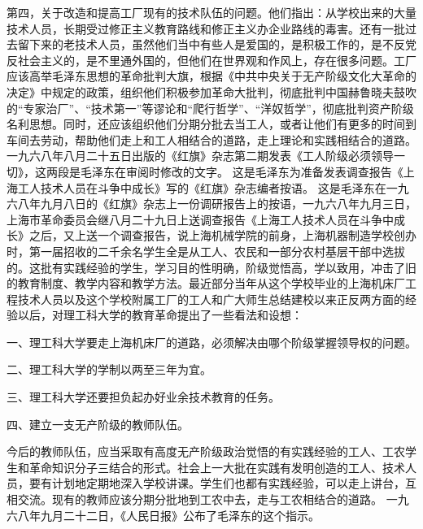 \begin{maonote}
第四，关于改造和提高工厂现有的技术队伍的问题。他们指出：从学校出来的大量技术人员，长期受过修正主义教育路线和修正主义办企业路线的毒害。还有一批过去留下来的老技术人员，虽然他们当中有些人是爱国的，是积极工作的，是不反党反社会主义的，是不里通外国的，但他们在世界观和作风上，存在很多问题。工厂应该高举毛泽东思想的革命批判大旗，根据《中共中央关于无产阶级文化大革命的决定》中规定的政策，组织他们积极参加革命大批判，彻底批判中国赫鲁晓夫鼓吹的“专家治厂”、“技术第一”等谬论和“爬行哲学”、“洋奴哲学”，彻底批判资产阶级名利思想。同时，还应该组织他们分期分批去当工人，或者让他们有更多的时间到车间去劳动，帮助他们走上和工人相结合的道路，走上理论和实践相结合的道路。
一九六八年八月二十五日出版的《红旗》杂志第二期发表《工人阶级必须领导一切》，这两段是毛泽东在审阅时修改的文字。
这是毛泽东为准备发表调查报告《上海工人技术人员在斗争中成长》写的《红旗》杂志编者按语。
这是毛泽东在一九六八年九月八日的《红旗》杂志上一份调研报告上的按语，一九六八年九月三日，上海市革命委员会继八月二十九日上送调查报告《上海工人技术人员在斗争中成长》之后，又上送一个调查报告，说上海机械学院的前身，上海机器制造学校创办时，第一届招收的二千余名学生全是从工人、农民和一部分农村基层干部中选拔的。这批有实践经验的学生，学习目的性明确，阶级觉悟高，学以致用，冲击了旧的教育制度、教学内容和教学方法。最近部分当年从这个学校毕业的上海机床厂工程技术人员以及这个学校附属工厂的工人和广大师生总结建校以来正反两方面的经验以后，对理工科大学的教育革命提出了一些看法和设想：

一、理工科大学要走上海机床厂的道路，必须解决由哪个阶级掌握领导权的问题。

二、理工科大学的学制以两至三年为宜。

三、理工科大学还要担负起办好业余技术教育的任务。

四、建立一支无产阶级的教师队伍。

今后的教师队伍，应当采取有高度无产阶级政治觉悟的有实践经验的工人、工农学生和革命知识分子三结合的形式。社会上一大批在实践有发明创造的工人、技术人员，要有计划地定期地深入学校讲课。学生们也都有实践经验，可以走上讲台，互相交流。现有的教师应该分期分批地到工农中去，走与工农相结合的道路。
一九六八年九月二十二日，《人民日报》公布了毛泽东的这个指示。
\end{maonote}
